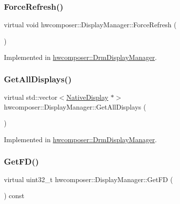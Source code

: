 \subsubsection{\texorpdfstring{Force\+Refresh()}{ForceRefresh()}}
{\footnotesize\ttfamily virtual void hwcomposer\+::\+Display\+Manager\+::\+Force\+Refresh (\begin{DoxyParamCaption}{ }\end{DoxyParamCaption})\hspace{0.3cm}{\ttfamily [pure virtual]}}



Implemented in \mbox{\hyperlink{classhwcomposer_1_1DrmDisplayManager_a254ab8fd550f20f056c2ec1e458442c9}{hwcomposer\+::\+Drm\+Display\+Manager}}.

\mbox{\label{classhwcomposer_1_1DisplayManager_aec3ebc4b4d22031e983856a424dd43a6}} 
\subsubsection{\texorpdfstring{Get\+All\+Displays()}{GetAllDisplays()}}
{\footnotesize\ttfamily virtual std\+::vector$<$\mbox{\hyperlink{classhwcomposer_1_1NativeDisplay}{Native\+Display}} $\ast$$>$ hwcomposer\+::\+Display\+Manager\+::\+Get\+All\+Displays (\begin{DoxyParamCaption}{ }\end{DoxyParamCaption})\hspace{0.3cm}{\ttfamily [pure virtual]}}



Implemented in \mbox{\hyperlink{classhwcomposer_1_1DrmDisplayManager_acff7605550c750e5f799f698e9b82d2a}{hwcomposer\+::\+Drm\+Display\+Manager}}.

\mbox{\label{classhwcomposer_1_1DisplayManager_a7af00ef1c1c9dc8f3fd58699460ab14d}} 
\subsubsection{\texorpdfstring{Get\+F\+D()}{GetFD()}}
{\footnotesize\ttfamily virtual uint32\+\_\+t hwcomposer\+::\+Display\+Manager\+::\+Get\+FD (\begin{DoxyParamCaption}{ }\end{DoxyParamCaption}) const\hspace{0.3cm}{\ttfamily [pure virtual]}}



